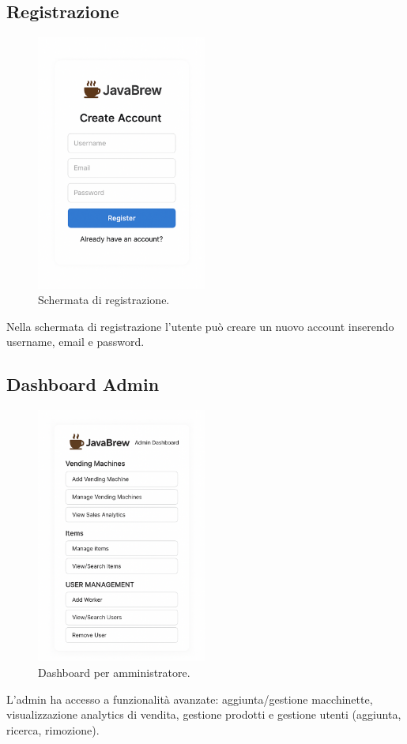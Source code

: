 \subsection{Registrazione}
\begin{figure}[H]
    \centering
    \includegraphics[width=0.5\textwidth]{./assets/Create_acoount.png}
    \caption{Schermata di registrazione.}
\end{figure}
Nella schermata di registrazione l’utente può creare un nuovo account inserendo username, email e password.

\subsection{Dashboard Admin}
\begin{figure}[H]
    \centering
    \includegraphics[width=0.5\textwidth]{./assets/admin_dashboard.png}
    \caption{Dashboard per amministratore.}
\end{figure}
L’admin ha accesso a funzionalità avanzate: aggiunta/gestione macchinette, visualizzazione analytics di vendita, gestione prodotti e gestione utenti (aggiunta, ricerca, rimozione).

